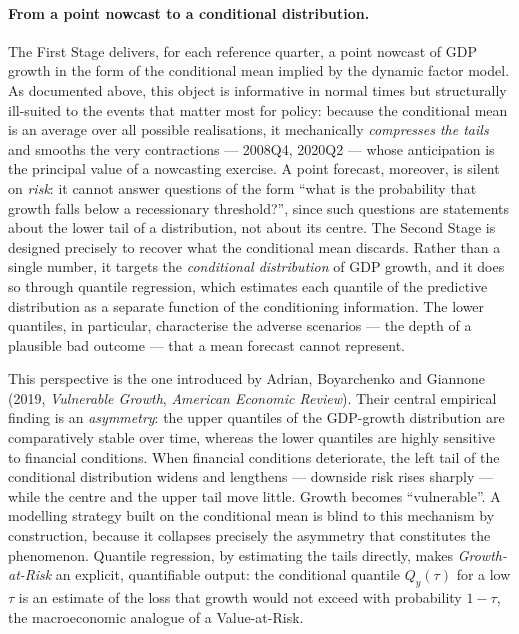 \documentclass[11pt, a4paper, oneside]{article}
\begin{document}
\paragraph{From a point nowcast to a conditional distribution.}
The First Stage delivers, for each reference quarter, a point
nowcast of GDP growth in the form of the conditional mean implied by
the dynamic factor model. As documented above, this object is
informative in normal times but structurally ill-suited to the
events that matter most for policy: because the conditional mean is
an average over all possible realisations, it mechanically
\emph{compresses the tails} and smooths the very contractions ---
2008Q4, 2020Q2 --- whose anticipation is the principal value of a
nowcasting exercise. A point forecast, moreover, is silent on
\emph{risk}: it cannot answer questions of the form ``what is the
probability that growth falls below a recessionary threshold?'',
since such questions are statements about the lower tail of a
distribution, not about its centre. The Second Stage is designed
precisely to recover what the conditional mean discards. Rather than
a single number, it targets the \emph{conditional distribution} of
GDP growth, and it does so through quantile regression, which
estimates each quantile of the predictive distribution as a separate
function of the conditioning information. The lower quantiles, in
particular, characterise the adverse scenarios --- the depth of a
plausible bad outcome --- that a mean forecast cannot represent.

This perspective is the one introduced by Adrian, Boyarchenko and
Giannone (2019, \emph{Vulnerable Growth}, \emph{American Economic
Review}). Their central empirical finding is an \emph{asymmetry}: the
upper quantiles of the GDP-growth distribution are comparatively
stable over time, whereas the lower quantiles are highly sensitive to
financial conditions. When financial conditions deteriorate, the
left tail of the conditional distribution widens and lengthens ---
downside risk rises sharply --- while the centre and the upper tail
move little. Growth becomes ``vulnerable''. A modelling strategy
built on the conditional mean is blind to this mechanism by
construction, because it collapses precisely the asymmetry that
constitutes the phenomenon. Quantile regression, by estimating the
tails directly, makes \emph{Growth-at-Risk} an explicit, quantifiable
output: the conditional quantile $Q_{y}(\tau)$ for a low $\tau$ is an
estimate of the loss that growth would not exceed with probability
$1-\tau$, the macroeconomic analogue of a Value-at-Risk.
\end{document}

